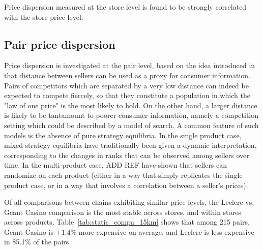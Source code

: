 \documentclass[english]{article}
\begin{document}
Price dispersion measured at the store level is found to be strongly correlated with the store price level.
 
\subsection{Pair price dispersion}

Price dispersion is investigated at the pair level, based on the idea introduced in \cite{TAP11} that distance between sellers can be used as a proxy for consumer information. Pairs of competitors which are separated by a very low distance can indeed be expected to compete fiercely, so that they constitute a population in which the "law of one price" is the most likely to hold. On the other hand, a larger distance is likely to be tantamount to poorer consumer information, namely a competition setting which could be described by a model of search. A common feature of such models is the absence of pure strategy equilibria. In the single product case, mixed strategy equilibria have traditionally been given a dynamic interpretation, corresponding to the changes in ranks that can be observed among sellers over time. In the multi-product case, ADD REF have shown that sellers can randomize on each product (either in a way that simply replicates the single product case, or in a way that involves a correlation between a seller's prices).

Of all comparisons between chains exhibiting similar price levels, the Leclerc vs. Geant Casino comparison is the most stable across stores, and within stores across products. Table~\ref{tab:static_compa_15km} shows that among 215 pairs, Geant Casino is +1.4\% more expensive on average, and Leclerc is less expensive in 85.1\% of the pairs.
\end{document}
